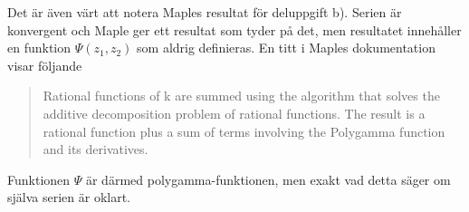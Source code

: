 \documentclass[a4paper]{article}
\begin{document}
Det är även värt att notera Maples resultat för deluppgift b). Serien är
konvergent och Maple ger ett resultat som tyder på det, men resultatet
innehåller en funktion $\Psi(z_1, z_2)$ som aldrig definieras. En titt i Maples
dokumentation visar följande

\begin{quote}
  Rational functions of k are summed using the algorithm that solves the additive decomposition problem of rational functions. The result is a rational function plus a sum of terms involving the Polygamma function and its derivatives.
\end{quote}

\noindent Funktionen $\Psi$ är därmed polygamma-funktionen, men exakt vad detta
säger om själva serien är oklart.
\end{document}
